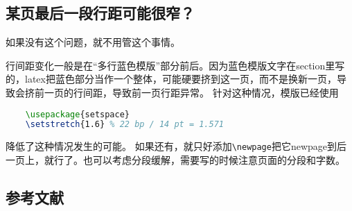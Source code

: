 \subsection{某页最后一段行距可能很窄？}
如果没有这个问题，就不用管这个事情。

行间距变化一般是在“多行蓝色模版”部分前后。因为蓝色模版文字在section里写的，latex把蓝色部分当作一个整体，可能硬要挤到这一页，而不是换新一页，导致会挤前一页的行间距，导致前一页行距异常。
针对这种情况，模版已经使用
\begin{lstlisting}[language=tex, basicstyle=\ttfamily\small, keywordstyle=\color{blue}, commentstyle=\color{gray}]
	%自动段落的行间距微调
	\usepackage{setspace}
	\setstretch{1.6} % 22 bp / 14 pt = 1.571
\end{lstlisting}
降低了这种情况发生的可能。
如果还有，就只好添加\verb|\newpage|把它newpage到后一页上，就行了。也可以考虑分段缓解，需要写的时候注意页面的分段和字数。

\begin{REF}
\subsection*{参考文献}
\vspace{-50pt}

\end{REF}

\newpage%